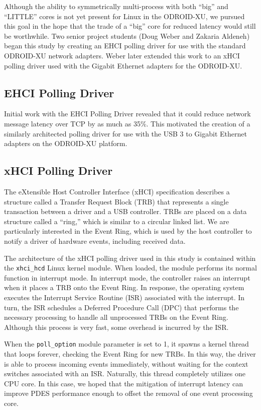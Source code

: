 \documentclass[11pt]{book}
\begin{document}
Although the ability to symmetrically multi-process with both ``big'' and ``LITTLE'' cores
is not yet present for Linux in the ODROID-XU, we pursued this goal in the hope that the
trade of a ``big'' core for reduced latency would still be worthwhile.  Two senior project
students (Doug Weber and Zakaria Aldeneh) began this study by creating an EHCI polling
driver for use with the standard ODROID-XU network adapters.  Weber later extended this
work to an xHCI polling driver used with the Gigabit Ethernet adapters for the ODROID-XU.

\subsection{EHCI Polling Driver}

Initial work with the EHCI Polling Driver revealed that it could reduce network message
latency over TCP by as much as 35\%.  This motivated the creation of a similarly
architected polling driver for use with the USB 3 to Gigabit Ethernet adapters on the
ODROID-XU platform.

\subsection{xHCI Polling Driver}

The eXtensible Host Controller Interface (xHCI) specification \cite{xhci} describes a
structure called a Transfer Request Block (TRB) that represents a single transaction
between a driver and a USB controller.  TRBs are placed on a data structure called a
``ring,'' which is similar to a circular linked list.  We are particularly interested in
the Event Ring, which is used by the host controller to notify a driver of hardware
events, including received data.

The architecture of the xHCI polling driver used in this study is contained within the
\verb;xhci_hcd; Linux kernel module.  When loaded, the module performs its normal function
in interrupt mode.  In interrupt mode, the controller raises an interrupt when it places a
TRB onto the Event Ring.  In response, the operating system executes the Interrupt Service
Routine (ISR) associated with the interrupt.  In turn, the ISR schedules a Deferred
Procedure Call (DPC) that performs the necessary processing to handle all unprocessed TRBs
on the Event Ring.  Although this process is very fast, some overhead is incurred by the
ISR.

When the \verb;poll_option; module parameter is set to 1, it spawns a kernel thread that
loops forever, checking the Event Ring for new TRBs.  In this way, the driver is able to
process incoming events immediately, without waiting for the context switches associated
with an ISR.  Naturally, this thread completely utilizes one CPU core.  In this case, we
hoped that the mitigation of interrupt latency can improve PDES performance enough to
offset the removal of one event processing core.
\end{document}
